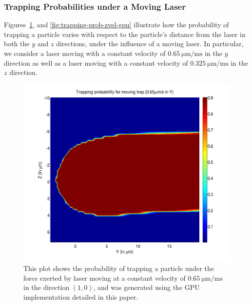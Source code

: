 \subsubsection{Trapping Probabilities under a Moving Laser}

Figures~\ref{fig:trapping-prob-xyvel-gpu}, and \ref{fig:trapping-prob-zvel-gpu}
illustrate how the probability of
trapping a particle varies with respect to the particle's distance from
the laser in both the $y$ and $z$ directions, under the influence of a
moving laser.  In particular, we consider a laser moving with a
constant velocity of $\SI{0.65}{\micro\meter\per\milli\second}$
in the $y$ direction as well as a laser moving with a constant
velocity of $\SI{0.325}{\micro\meter\per\milli\second}$ in the
$z$ direction.

\begin{figure}[htb!]
  \includegraphics[width=\columnwidth]{figures/gpu_moving_0_65_y}
\caption{
  This plot shows the probability of trapping a particle under
  the force exerted by laser moving at a constant velocity of
  $\SI{0.65}{\micro\meter\per\milli\second}$ in the direction
  $(1,0)$, and was generated using the GPU implementation detailed in 
  this paper.
}

\label{fig:trapping-prob-xyvel-gpu}
\end{figure}



